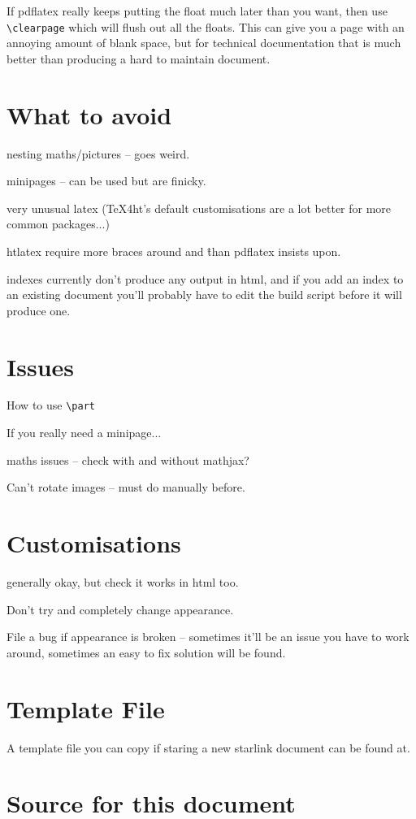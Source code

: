 \documentclass[twoside,11pt,nolof]{starlink}
\begin{document}
If pdflatex really keeps putting the float much later than you want,
then use \verb+\clearpage+ which will flush out all the floats. This
can give you a page with an annoying amount of blank space, but for
technical documentation that is much better than producing a hard to
maintain document.

\section{What to avoid}

nesting maths/pictures -- goes weird.

minipages -- can be used but are finicky.

very unusual latex (TeX4ht's default customisations are a lot better
for more common packages...)

htlatex require more braces around \textunderscore and \^ than
pdflatex insists upon.

indexes currently don't produce any output in html, and if you add an
index to an existing document you'll probably have to edit the build
script before it will produce one.


\section{Issues}

How to use \verb+\part+

If you really need a minipage...

maths issues -- check with and without mathjax?

Can't rotate images -- must do manually before.

\section{Customisations}

generally okay, but check it works in html too.

Don't try and completely change appearance.

File a bug if appearance is broken -- sometimes it'll be an issue you
have to work around, sometimes an easy to fix solution will be found.



\section{Template File}

A template file you can copy if staring a new starlink document can be found at.

\appendix

\section{Source for this document}
\end{document}
